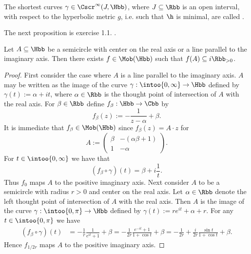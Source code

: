 \begin{definition}[Geodesics]
	The shortest curves $\gamma \in \Cscr^\infty(J,\Hbb)$, where $J \subseteq \Rbb$ is an open interval, with respect to the hyperbolic metric $g$, i.e. such that $\h$ is minimal, are called .
\end{definition}

The next proposition is exercise 1.1. \cite[21]{katok:Fuchsian_groups:1992}.

\begin{proposition}
	Let $A \subseteq \Hbb$ be a semicircle with center on the real axis or a line parallel to the imaginary axis. Then there exists $f \in \Mob(\Hbb)$ such that $f(A) \subseteq i\Rbb_{>0}$.
	\label{prop:mapping_to_imaginary_axis}
\end{proposition}

\begin{proof}
	First consider the case where $A$ is a line parallel to the imaginary axis. $A$ may be written as the image of the curve $\gamma : \intoo{0,\infty} \to \Hbb$ defined by $\gamma(t) := \alpha + it$, where $\alpha \in \Rbb$ is the thought point of intersection of $A$ with the real axis. For $\beta \in \Rbb$ define $f_\beta : \Hbb \to \Cbb$ by
	\begin{equation}
		f_\beta(z) := -\frac{1}{z - \alpha} + \beta. 	
	\end{equation}
	It is immediate that $f_\beta \in \Mob(\Hbb)$ since $f_\beta(z) = A \cdot z$ for 
	\begin{equation*}
		A := \begin{pmatrix}
			\beta & - (\alpha\beta + 1)\\
			1 & -\alpha
		\end{pmatrix}.
	\end{equation*}
	For $t \in \intoo{0,\infty}$ we have that
	\begin{equation*}
		(f_\beta \circ \gamma)(t) = \beta + i\frac{1}{t}.
	\end{equation*}
	Thus $f_0$ maps $A$ to the positive imaginary axis. Next consider $A$ to be a semicircle with radius $r > 0$ and center on the real axis. Let $\alpha \in \Rbb$ denote the left thought point of intersection of $A$ with the real axis. Then $A$ is the image of the curve $\gamma : \intoo{0,\pi} \to \Hbb$ defined by $\gamma(t) := re^{it} + \alpha + r$. For any $t \in \intoo{0,\pi}$ we have 
	\begin{align*}
		(f_\beta \circ \gamma)(t) &= -\frac{1}{r}\frac{1}{e^{it} + 1} + \beta = -\frac{1}{2r}\frac{e^{-it} + 1}{1 + \cos t} + \beta = -\frac{1}{2r} + \frac{i}{2r} \frac{\sin t}{1 + \cos t} + \beta.
	\end{align*}
	Hence $f_{1/2r}$ maps $A$ to the positive imaginary axis.
\end{proof}

